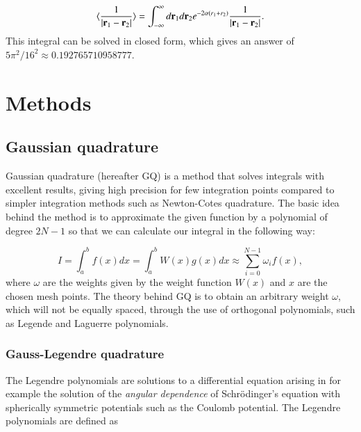 \documentclass{article}
\begin{document}
\begin{equation}\label{eq:correlationenergy}
	\langle \frac{1}{|{\bf r}_1-{\bf r}_2|} \rangle = \int_{-\infty}^{\infty} d{\bf r}_1d{\bf r}_2  e^{-2\alpha (r_1+r_2)}\frac{1}{|{\bf r}_1-{\bf r}_2|}.
\end{equation}
This integral can be solved in closed form, which gives an answer of $5\pi^2/16^2 \approx 0.192765710958777$.



\section{Methods}

\subsection{Gaussian quadrature}
Gaussian quadrature (hereafter GQ) is a method that solves integrals with excellent results, giving high precision for few integration points compared to simpler integration methods such as Newton-Cotes quadrature. The basic idea behind the method is to approximate the given function by a polynomial of degree $2N-1$ so that we can calculate our integral in the following way:

\begin{equation}
	I = \int_a^b f(x) dx = \int_a^b W(x) g(x) dx \approx \sum_{i = 0}^{N-1} \omega_i f(x),
\end{equation}
where $\omega$ are the weights given by the weight function $W(x)$ and $x$ are the chosen mesh points. The theory behind GQ is to obtain an arbitrary weight $\omega$, which will not be equally spaced, through the use of orthogonal polynomials, such as Legende and Laguerre polynomials. 

%
%


\subsubsection{Gauss-Legendre quadrature}
The Legendre polynomials are solutions to a differential equation arising in for example the solution of the \textit{angular dependence} of Schr\"{o}dinger's equation with spherically symmetric potentials such as the Coulomb potential. The Legendre polynomials are defined as
\end{document}
